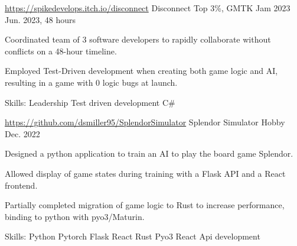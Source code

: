 \begin{cventries}
  \cventry
   {\href{https://spikedevelops.itch.io/disconnect}{https://spikedevelops.itch.io/disconnect}} %
    {Disconnect} %
    {Top 3\%, GMTK Jam 2023} %
    {Jun. 2023, 48 hours} %
    {
      \begin{cvitems} %
        \item {Coordinated team of 3 software developers to rapidly collaborate without conflicts on a 48-hour timeline.}
        \item {Employed Test-Driven development when creating both game logic and AI, resulting in a game with 0 logic bugs at launch.}
        \item {Skills: Leadership \textbullet{} Test driven development \textbullet{} C\#}
      \end{cvitems}
    }

 \cventry
  {\href{https://github.com/dsmiller95/SplendorSimulator}{https://github.com/dsmiller95/SplendorSimulator}} %
   {Splendor Simulator} %
   {Hobby} %
   {Dec. 2022} %
   {
     \begin{cvitems} %
      \item {Designed a python application to train an AI to play the board game Splendor.}
      \item {Allowed display of game states during training with a Flask API and a React frontend.}
      \item {Partially completed migration of game logic to Rust to increase performance, binding to python with pyo3/Maturin.}
      \item {Skills: Python \textbullet{} Pytorch \textbullet{} Flask \textbullet{} React \textbullet{} Rust \textbullet{} Pyo3 \textbullet{} React \textbullet{} Api development }
     \end{cvitems}
   }



\end{cventries}

